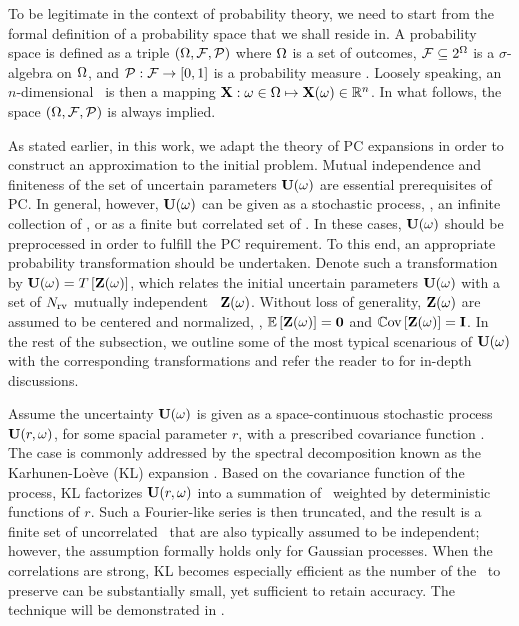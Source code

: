To be legitimate in the context of probability theory, we need to start from the formal definition of a probability space that we shall reside in. A probability space is defined as a triple $(\Omega, \mathcal{F}, \mathcal{P})$ where $\Omega$ is a set of outcomes, $\mathcal{F} \subseteq 2^\Omega$ is a $\sigma$-algebra on $\Omega$, and $\mathcal{P}: \mathcal{F} \to [0, 1]$ is a probability measure \cite{durrett2010}. Loosely speaking, an $n$-dimensional \rv\ is then a mapping $\mathbf{X}: \omega \in \Omega \mapsto \mathbf{X}(\omega) \in \mathbb{R}^n$. In what follows, the space $(\Omega, \mathcal{F}, \mathcal{P})$ is always implied.

As stated earlier, in this work, we adapt the theory of PC expansions in order to construct an approximation to the initial problem. Mutual independence and finiteness of the set of uncertain parameters $\mathbf{U}(\omega)$ are essential prerequisites of PC. In general, however, $\mathbf{U}(\omega)$ can be given as a stochastic process, \ie, an infinite collection of \rvs, or as a finite but correlated set of \rvs. In these cases, $\mathbf{U}(\omega)$ should be preprocessed in order to fulfill the PC requirement. To this end, an appropriate probability transformation should be undertaken. Denote such a transformation by $\mathbf{U}(\omega) = T\left[\mathbf{Z}(\omega)\right]$, which relates the initial uncertain parameters $\mathbf{U}(\omega)$ with a set of ${N_\text{rv}}$ mutually independent \rvs\ $\mathbf{Z}(\omega)$. Without loss of generality, $\mathbf{Z}(\omega)$ are assumed to be centered and normalized, \ie, $\oExp{\vZ(\o)} = \mZero$ and $\oCov{\vZ(\o)} = \mI$. In the rest of the subsection, we outline some of the most typical scenarious of $\mathbf{U}(\omega)$ with the corresponding transformations and refer the reader to \cite{xiu2010, eldred2009} for in-depth discussions.

Assume the uncertainty $\mathbf{U}(\omega)$ is given as a space-continuous stochastic process $\mathbf{U}(r, \omega)$, for some spacial parameter $r$, with a prescribed covariance function \cite{durrett2010}. The case is commonly addressed by the spectral decomposition known as the Karhunen-Lo\`{e}ve (KL) expansion \cite{xiu2010, maitre2010, ghanem1991}. Based on the covariance function of the process, KL factorizes $\mathbf{U}(r, \omega)$ into a summation of \rvs\ weighted by deterministic functions of $r$. Such a Fourier-like series is then truncated, and the result is a finite set of uncorrelated \rvs\ that are also typically assumed to be independent; however, the assumption formally holds only for Gaussian processes. When the correlations are strong, KL becomes especially efficient as the number of the \rvs\ to preserve can be substantially small, yet sufficient to retain accuracy. The technique will be demonstrated in .

